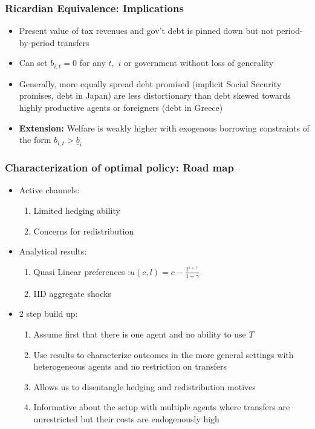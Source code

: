 \documentclass{beamer}
\begin{document}
\begin{frame}\label{ricardian eqv}
 \frametitle{Ricardian Equivalence: Implications}
 \begin{itemize}
\item Present value of tax revenues and gov't debt is pinned down but not period-by-period transfers

\item Can set $b_{i,t}=0$ for any $t,$ $i$ or government without loss of
generality

 \item Generally, more equally spread debt promised (implicit Social Security
promises, debt in Japan) are less distortionary than debt skewed towards
highly productive agents or foreigners (debt in Greece)

 \item \textbf{Extension:} Welfare is weakly higher with exogenous borrowing constraints of the form $b_{i,t}>\underline{b}_i$ 

\hyperlink{credit limits}{}

\end{itemize}
\end{frame}


\begin{frame}
\frametitle{Characterization of optimal policy: Road map}
\begin{itemize}
\item Active channels:
\begin{enumerate}
\item Limited hedging ability
\item Concerns for redistribution
\end{enumerate}
\item Analytical results:
\begin{enumerate}
\item Quasi Linear preferences :$u(c,l)=c-\frac{l^{1+\gamma }}{1+\gamma }$
\item IID aggregate shocks
\end{enumerate}
\item 2 step build up:
\begin{enumerate}
\item Assume first that there is one agent and no ability to use $T$
\item Use results to characterize outcomes in the more general settings with heterogeneous agents and no restriction on transfers
\item Allows us to disentangle hedging and redistribution motives
\item Informative about the setup with multiple agents where transfers are unrestricted but their costs are endogenously high
\end{enumerate}
\end{itemize}
\end{frame}
\end{document}
